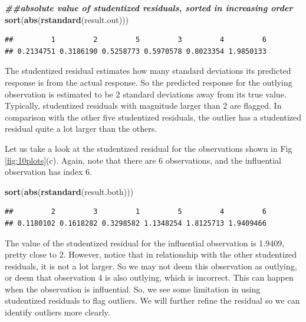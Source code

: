 \documentclass[
]{book}
\newenvironment{Shaded}{\begin{snugshade}}{\end{snugshade}}
\newcommand{\DocumentationTok}[1]{\textcolor[rgb]{0.56,0.35,0.01}{\textbf{\textit{#1}}}}
\newcommand{\FunctionTok}[1]{\textcolor[rgb]{0.13,0.29,0.53}{\textbf{#1}}}
\newcommand{\NormalTok}[1]{#1}
\begin{document}
\begin{Shaded}
\begin{Highlighting}[]
\DocumentationTok{\#\#absolute value of studentized residuals, sorted in increasing order}
\FunctionTok{sort}\NormalTok{(}\FunctionTok{abs}\NormalTok{(}\FunctionTok{rstandard}\NormalTok{(result.out)))}
\end{Highlighting}
\end{Shaded}

\begin{verbatim}
##         1         2         5         3         4         6 
## 0.2134751 0.3186190 0.5258773 0.5970578 0.8023354 1.9850133
\end{verbatim}

The studentized residual estimates how many standard deviations its predicted response is from the actual response. So the predicted response for the outlying observation is estimated to be 2 standard deviations away from its true value. Typically, studentized residuals with magnitude larger than 2 are flagged. In comparison with the other five studentized residuals, the outlier has a studentized residual quite a lot larger than the others.

Let us take a look at the studentized residual for the observations shown in Fig \ref{fig:10plots}(c). Again, note that there are 6 observations, and the influential observation has index 6.

\begin{Shaded}
\begin{Highlighting}[]
\FunctionTok{sort}\NormalTok{(}\FunctionTok{abs}\NormalTok{(}\FunctionTok{rstandard}\NormalTok{(result.both)))}
\end{Highlighting}
\end{Shaded}

\begin{verbatim}
##         2         3         1         5         4         6 
## 0.1180102 0.1618282 0.3298582 1.1348254 1.8125713 1.9409466
\end{verbatim}

The value of the studentized residual for the influential observation is 1.9409, pretty close to 2. However, notice that in relationship with the other studentized residuals, it is not a lot larger. So we may not deem this observation as outlying, or deem that observation 4 is also outlying, which is incorrect. This can happen when the observation is influential. So, we see some limitation in using studentized residuals to flag outliers. We will further refine the residual so we can identify outliers more clearly.
\end{document}
